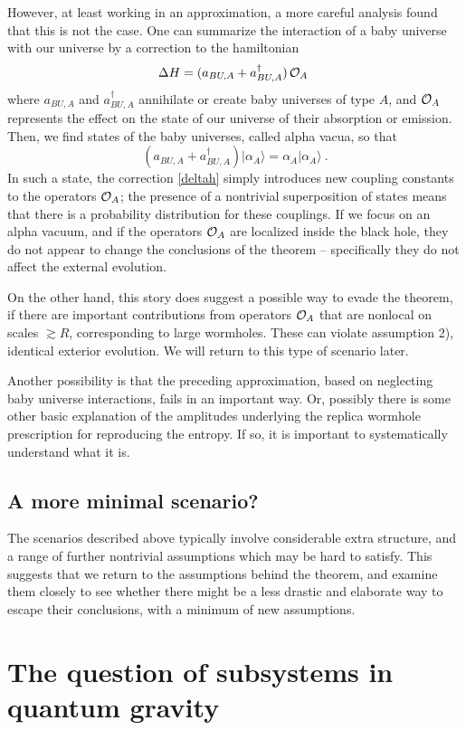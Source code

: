 \documentclass[11pt]{article}
\numberwithin{equation}{section}
\newcommand{\calo}{{\cal O}}
\newcommand{\beq}{\begin{equation}}
\newcommand{\eeq}{\end{equation}}
\begin{document}
However, at least working in an approximation, a more careful analysis\cite{Cole,GiStinc} found that this is not the case.  One can summarize the interaction of a baby universe with our universe by a correction to the hamiltonian
\beq\label{deltah}
\Delta H = (a_{BU,A}+a_{BU,A}^\dagger) \, {\cal O}_A\ 
\eeq
where $a_{BU,A}$ and $a_{BU,A}^\dagger$ annihilate or create baby universes of type $A$, and $\calo_A$ represents the effect on the state of our universe of their absorption or emission.  Then, we find states of the baby universes, called alpha vacua, so that
\beq
(a_{BU,A}+a_{BU,A}^\dagger)|\alpha_A\rangle=\alpha_A|\alpha_A\rangle\ .
\eeq
In such a state, the correction \eqref{deltah} simply introduces new coupling constants to the operators $\calo_A$; the presence of a nontrivial superposition of states means that there is a probability distribution for these couplings.  If we focus on an alpha vacuum, and if the operators $\calo_A$ are localized inside the black hole, they do not appear to change the conclusions of the theorem -- specifically they do not affect the external evolution.  

On the other hand, this story does suggest a possible way to evade the theorem, if there are important contributions from operators $\calo_A$ that are nonlocal on scales $\gtrsim R$, corresponding to large wormholes.  These can violate assumption 2), identical exterior evolution.  We will return to this type of scenario later.

Another possibility is that the preceding approximation, based on neglecting baby universe interactions, fails in an important way.  Or, possibly there is some other basic explanation of the amplitudes underlying the replica wormhole prescription for reproducing the entropy.  If so, it is important to systematically understand what it is.

\subsection{A more minimal scenario?}

The scenarios described above typically involve considerable extra structure, and a range of further nontrivial assumptions which may be hard to satisfy.  This suggests that we return to the assumptions behind the theorem, and examine them closely to see whether there might be a less drastic and elaborate way to escape their conclusions, with a minimum of new assumptions.

\section{The question of subsystems in quantum gravity}
\end{document}
